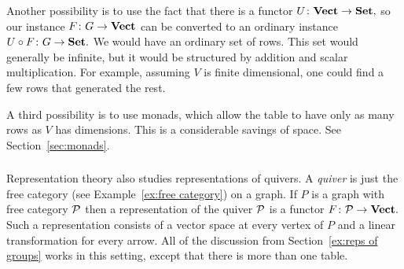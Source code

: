 \documentclass[CT4S-EN-RU]{subfiles}
\begin{document}
\begin{blockRUS}
\end{blockRUS}

\begin{blockENG}
Another possibility is to use the fact that there is a functor $U\colon{\mathbf{Vect}}\rightarrow{\mathbf{Set}},$ so our instance $F\colon G\rightarrow{\mathbf{Vect}}$ can be converted to an ordinary instance $U\circ F\colon G\rightarrow{\mathbf{Set}}.$ We would have an ordinary set of rows. This set would generally be infinite, but it would be structured by addition and scalar multiplication. For example, assuming $V$ is finite dimensional, one could find a few rows that generated the rest. 
\end{blockENG}

\begin{blockRUS}
\end{blockRUS}

\begin{blockENG}
A third possibility is to use monads, which allow the table to have only as many rows as $V$ has dimensions. This is a considerable savings of space. See Section~\ref{sec:monads}.
\end{blockENG}

\begin{blockRUS}
\end{blockRUS}


\subsubsection{}

\begin{blockENG}
Representation theory also studies representations of quivers. A {\em quiver} is just the free category (see Example~\ref{ex:free category}) on a graph. If $P$ is a graph with free category $\mathcal{P}$ then a representation of the quiver $\mathcal{P}$ is a functor $F\colon\mathcal{P}\rightarrow{\mathbf{Vect}}.$ Such a representation consists of a vector space at every vertex of $P$ and a linear transformation for every arrow. All of the discussion from Section~\ref{ex:reps of groups} works in this setting, except that there is more than one table.
\end{blockENG}

\begin{blockRUS}
\end{blockRUS}
\end{document}
